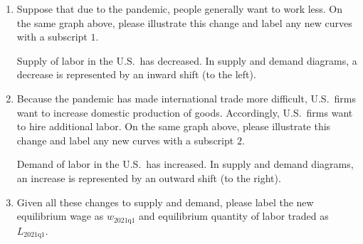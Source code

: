 \documentclass[
    letterpaper,paper=portrait,fleqn,
    DIV=16,fontsize=12pt,twoside=semi,
    parskip=full-,
    headings=standardclasses]
{scrartcl}
\begin{document}
\begin{enumerate}
\item Suppose that due to the pandemic, people generally want to work less. On the same graph above, please illustrate this change and label any new curves with a subscript $1$.

\begin{solution}
Supply of labor in the U.S.~has decreased. In supply and demand diagrams, a decrease is represented by an inward shift (to the left).

\begin{center}
\end{center}
\end{solution}

\item Because the pandemic has made international trade more difficult, U.S.~firms want to increase domestic production of goods. Accordingly, U.S.~firms want to hire additional labor. On the same graph above, please illustrate this change and label any new curves with a subscript $2$.

\begin{solution}
Demand of labor in the U.S.~has increased. In supply and demand diagrams, an increase is represented by an outward shift (to the right).

\begin{center}
\end{center}
\end{solution}

\item Given all these changes to supply and demand, please label the new equilibrium wage as $w_\text{2021q1}$ and equilibrium quantity of labor traded as $L_\text{2021q1}$.


\end{enumerate}
\end{document}
